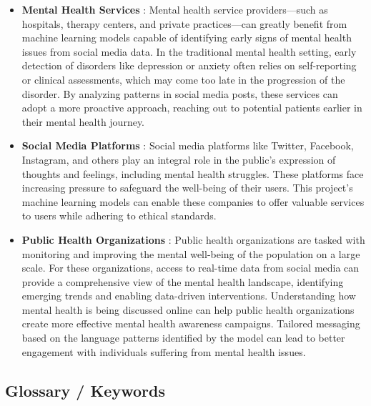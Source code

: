 \begin{itemize}
    
    \item \textbf{Mental Health Services} :
    \noindent
    Mental health service providers—such as hospitals, therapy centers, and private practices—can greatly benefit from machine learning models capable of identifying early signs of mental health issues from social media data. In the traditional mental health setting, early detection of disorders like depression or anxiety often relies on self-reporting or clinical assessments, which may come too late in the progression of the disorder. By analyzing patterns in social media posts, these services can adopt a more proactive approach, reaching out to potential patients earlier in their mental health journey.

    \item \textbf{Social Media Platforms} :
    \noindent
    Social media platforms like Twitter, Facebook, Instagram, and others play an integral role in the public’s expression of thoughts and feelings, including mental health struggles. These platforms face increasing pressure to safeguard the well-being of their users. This project’s machine learning models can enable these companies to offer valuable services to users while adhering to ethical standards.

    \item \textbf{Public Health Organizations} :
    \noindent
    Public health organizations are tasked with monitoring and improving the mental well-being of the population on a large scale. For these organizations, access to real-time data from social media can provide a comprehensive view of the mental health landscape, identifying emerging trends and enabling data-driven interventions. Understanding how mental health is being discussed online can help public health organizations create more effective mental health awareness campaigns. Tailored messaging based on the language patterns identified by the model can lead to better engagement with individuals suffering from mental health issues.
    
\end{itemize}

\subsection{Glossary / Keywords}
\noindent

